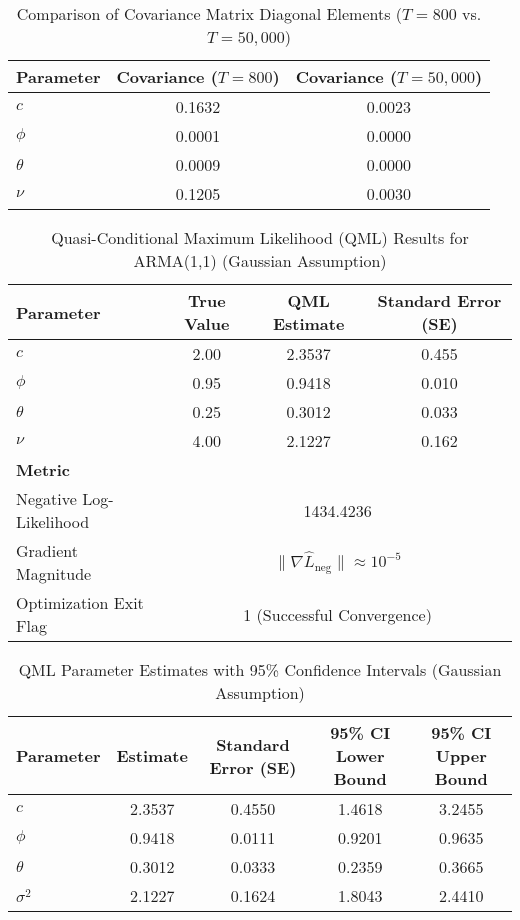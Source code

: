 \documentclass[a4paper,12pt]{article}
\begin{document}
\begin{table}[h!]
\centering
\caption{Comparison of Covariance Matrix Diagonal Elements (\( T = 800 \) vs. \( T = 50,000 \))}
\label{tab:cov_matrix_comparison}
\begin{tabular}{@{}lcc@{}}
\toprule
\textbf{Parameter} & \textbf{Covariance (\( T = 800 \))} & \textbf{Covariance (\( T = 50,000 \))} \\ \midrule
$c$      & 0.1632  & 0.0023  \\
$\phi$   & 0.0001  & 0.0000  \\
$\theta$ & 0.0009  & 0.0000  \\
$\nu$    & 0.1205  & 0.0030  \\ \bottomrule
\end{tabular}
\end{table}




\begin{table}[h!]
\centering
\caption{Quasi-Conditional Maximum Likelihood (QML) Results for ARMA(1,1) (Gaussian Assumption)}
\label{tab:qml_results}
\begin{tabular}{@{}lccc@{}}
\toprule
\textbf{Parameter} & \textbf{True Value} & \textbf{QML Estimate} & \textbf{Standard Error (SE)} \\ \midrule
$c$      & 2.00  & 2.3537  & 0.455 \\ 
$\phi$   & 0.95  & 0.9418  & 0.010 \\ 
$\theta$ & 0.25  & 0.3012  & 0.033 \\ 
$\nu$    & 4.00  & 2.1227  & 0.162 \\ \midrule
\textbf{Metric} & \multicolumn{3}{c}{} \\ \midrule
Negative Log-Likelihood & \multicolumn{3}{c}{1434.4236} \\
Gradient Magnitude      & \multicolumn{3}{c}{$\|\nabla \hat{L}_{\text{neg}}\| \approx 10^{-5}$} \\
Optimization Exit Flag  & \multicolumn{3}{c}{1 (Successful Convergence)} \\ \bottomrule
\end{tabular}
\end{table}

\begin{table}[h!]
\centering
\caption{QML Parameter Estimates with 95\% Confidence Intervals (Gaussian Assumption)}
\label{tab:qml_ci_results}
\begin{tabular}{@{}lcccc@{}}
\toprule
\textbf{Parameter} & \textbf{Estimate} & \textbf{Standard Error (SE)} & \textbf{95\% CI Lower Bound} & \textbf{95\% CI Upper Bound} \\ \midrule
$c$      & 2.3537  & 0.4550  & 1.4618  & 3.2455  \\
$\phi$   & 0.9418  & 0.0111  & 0.9201  & 0.9635  \\
$\theta$ & 0.3012  & 0.0333  & 0.2359  & 0.3665  \\
$\sigma^2$ & 2.1227 & 0.1624  & 1.8043  & 2.4410  \\ \bottomrule
\end{tabular}
\end{table}
\end{document}
